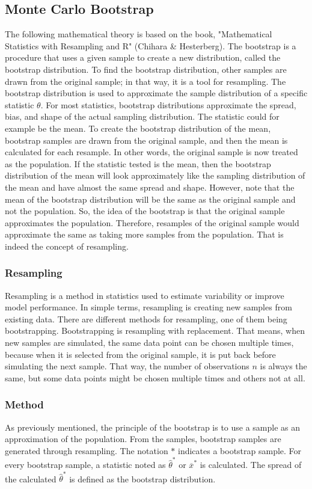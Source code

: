 \subsection{Monte Carlo Bootstrap}
The following mathematical theory is based on the book, "Mathematical Statistics with Resampling and R" (Chihara \& Hesterberg). The bootstrap is a procedure that uses a given sample to create a new distribution, called the bootstrap distribution. To find the bootstrap distribution, other samples are drawn from the original sample; in that way, it is a tool for resampling. The bootstrap distribution is used to approximate the sample distribution of a specific statistic $\theta$. For most statistics, bootstrap distributions approximate the spread, bias, and shape of the actual sampling distribution. The statistic could for example be the mean. To create the bootstrap distribution of the mean, bootstrap samples are drawn from the original sample, and then the mean is calculated for each resample. In other words, the original sample is now treated as the population. If the statistic tested is the mean, then the bootstrap distribution of the mean will look approximately like the sampling distribution of the mean and have almost the same spread and shape. However, note that the mean of the bootstrap distribution will be the same as the original sample and not the population. \newline
So, the idea of the bootstrap is that the original sample approximates the population. Therefore, resamples of the original sample would approximate the same as taking more samples from the population. That is indeed the concept of resampling.

\subsubsection{Resampling}
Resampling is a method in statistics used to estimate variability or improve model performance. In simple terms, resampling is creating new samples from existing data. There are different methods for resampling, one of them being bootstrapping. Bootstrapping is resampling with replacement. That means, when new samples are simulated, the same  data point can be chosen multiple times, because when it is selected from the original sample, it is put back before simulating the next sample. That way, the number of observations $n$ is always the same, but some data points might be chosen multiple times and others not at all.

\subsubsection{Method}
As previously mentioned, the principle of the bootstrap is to use a sample as an approximation of the population. From the samples, bootstrap samples are generated through resampling. The notation $*$ indicates a bootstrap sample. For every bootstrap sample, a statistic noted as $\hat{\theta}^*$ or $\overline{x}^*$ is calculated. The spread of the calculated $\hat{\theta}^*$ is defined as the bootstrap distribution.\newline

